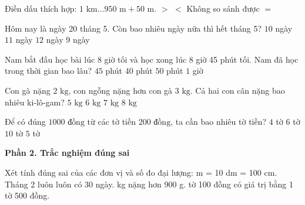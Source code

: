 \begin{ex} %
Điền dấu thích hợp: $1\text{ km} \dots 950\text{ m} + 50\text{ m}$.
\choice
{$>$}
{$<$}
{Không so sánh được}
{\True $=$}
\end{ex}

\begin{ex} %
Hôm nay là ngày 20 tháng 5. Còn bao nhiêu ngày nữa thì hết tháng 5?
\choice
{$10$ ngày}
{\True $11$ ngày}
{$12$ ngày}
{$9$ ngày}
\end{ex}

\begin{ex} %
Nam bắt đầu học bài lúc 8 giờ tối và học xong lúc 8 giờ 45 phút tối. Nam đã học trong thời gian bao lâu?
\choice
{\True $45$ phút}
{$40$ phút}
{$50$ phút}
{$1$ giờ}
\end{ex}

\begin{ex} %
Con gà nặng $2\text{ kg}$, con ngỗng nặng hơn con gà $3\text{ kg}$. Cả hai con cân nặng bao nhiêu ki-lô-gam?
\choice
{$5\text{ kg}$}
{$6\text{ kg}$}
{\True $7\text{ kg}$}
{$8\text{ kg}$}
\end{ex}

\begin{ex} %
Để có đúng $1 000\text{ đồng}$ từ các tờ tiền $200\text{ đồng}$, ta cần bao nhiêu tờ tiền?
\choice
{$4$ tờ}
{$6$ tờ}
{$10$ tờ}
{\True $5$ tờ}
\end{ex}

\textbf{Phần 2. Trắc nghiệm đúng sai}

\begin{ex} %
Xét tính đúng sai của các đơn vị và số đo đại lượng:
\choiceTF
{ m = 10 dm = 100 cm.}
{Tháng 2 luôn luôn có 30 ngày.}
{ kg nặng hơn 900 g.}
{ tờ 100 đồng có giá trị bằng 1 tờ 500 đồng.}
\end{ex}

